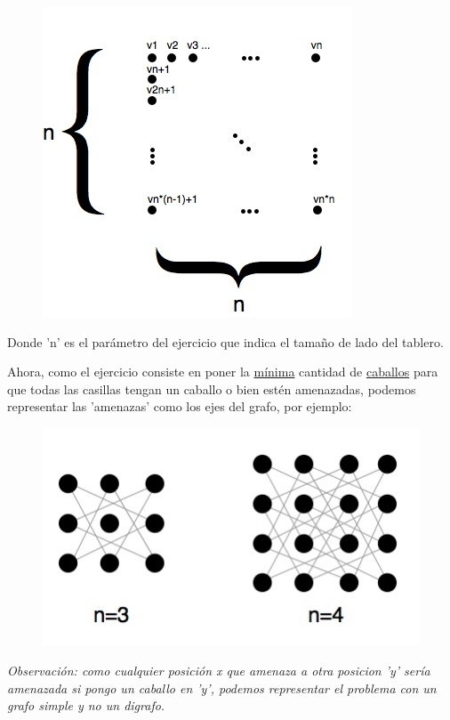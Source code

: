 \begin{figure}[h]
\begin{center}
\includegraphics[scale=0.5]{imagenes/grafos-ej1-tp3-1.jpg}
\end{center}
\end{figure}

Donde 'n' es el parámetro del ejercicio que indica el tamaño de lado del tablero.

\newpage

Ahora, como el ejercicio consiste en poner la \underline{mínima} cantidad de \underline{caballos} para que todas las casillas tengan un caballo o bien estén amenazadas, podemos representar las 'amenazas' como los ejes del grafo, por ejemplo:

\begin{figure}[h]
\begin{center}
\includegraphics[scale=0.5]{imagenes/grafos-ej1-tp3-2.jpg}
\end{center}
\end{figure}

\textit{Observación: como cualquier posición x que amenaza a otra posicion 'y' sería amenazada si pongo un caballo en 'y', podemos representar el problema con un grafo simple y no un digrafo.}

